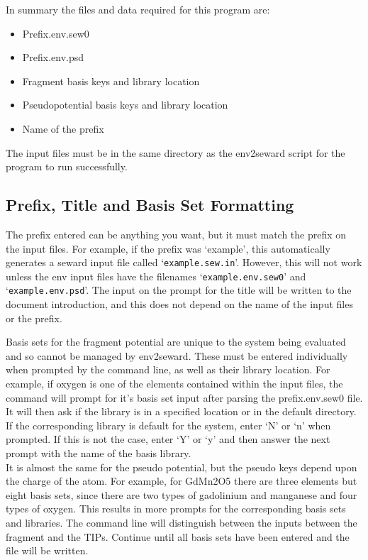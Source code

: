 \documentclass[10pt]{article}
\begin{document}
In summary the files and data required for this program are:
\begin{itemize}
	\item Prefix.env.sew0
	\item Prefix.env.psd
	\item Fragment basis keys and library location
	\item Pseudopotential basis keys and library location
	\item Name of the prefix
\end{itemize}
The input files must be in the same directory as the env2seward script for the program to run successfully.

\subsection{Prefix, Title and Basis Set Formatting}

The prefix entered can be anything you want, but it must match the prefix on the input files. For example, if the prefix was `example', this automatically generates a seward input file called `\texttt{example.sew.in}'. However, this will not work unless the env input files have the filenames `\texttt{example.env.sew0}' and `\texttt{example.env.psd}'. The input on the prompt for the title will be written to the document introduction, and this does not depend on the name of the input files or the prefix.

Basis sets for the fragment potential are unique to the system being evaluated and so cannot be managed by env2seward. These must be entered individually when prompted by the command line, as well as their library location. For example, if oxygen is one of the elements contained within the input files, the command will prompt for it's basis set input after parsing the prefix.env.sew0 file. It will then ask if the library is in a specified location or in the default directory. If the corresponding library is default for the system, enter `N' or `n' when prompted. If this is not the case, enter `Y' or `y' and then answer the next prompt with the name of the basis library.
\\
It is almost the same for the pseudo potential, but the pseudo keys depend upon the charge of the atom. For example, for GdMn2O5 there are three elements but eight basis sets, since there are two types of gadolinium and manganese and four types of oxygen. This results in more prompts for the corresponding basis sets and libraries. The command line will distinguish between the inputs between the fragment and the TIPs. Continue until all basis sets have been entered and the file will be written.
\end{document}

